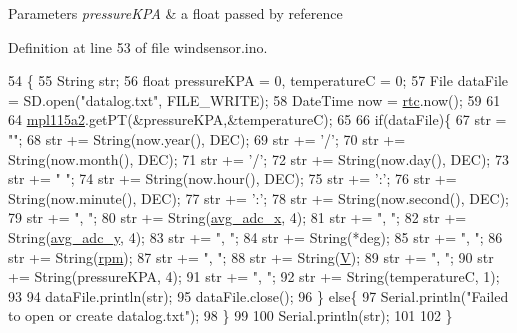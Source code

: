 \begin{DoxyParams}{Parameters}
{\em pressure\+K\+PA} & a float passed by reference\\
\hline
\end{DoxyParams}


Definition at line 53 of file windsensor.\+ino.


\begin{DoxyCode}
54 \{
55     String str;
56     \textcolor{keywordtype}{float} pressureKPA = 0, temperatureC = 0;
57     File dataFile = SD.open(\textcolor{stringliteral}{"datalog.txt"}, FILE\_WRITE);
58     DateTime now = \mbox{\hyperlink{windsensor_8ino_adab40bd3cc2c36728a2a34e813a75b88}{rtc}}.now();
59 
61 
64     \mbox{\hyperlink{windsensor_8ino_ad968397c6ea6b9db90c2cab353353f5a}{mpl115a2}}.getPT(&pressureKPA,&temperatureC);
65     
66     \textcolor{keywordflow}{if}(dataFile)\{
67         str = \textcolor{stringliteral}{""};
68         str += String(now.year(), DEC);
69         str += \textcolor{charliteral}{'/'};
70         str += String(now.month(), DEC);
71         str += \textcolor{charliteral}{'/'};
72         str += String(now.day(), DEC);
73         str += \textcolor{stringliteral}{" "};
74         str += String(now.hour(), DEC);
75         str += \textcolor{charliteral}{':'};
76         str += String(now.minute(), DEC);
77         str += \textcolor{charliteral}{':'};
78         str += String(now.second(), DEC);  
79         str += \textcolor{stringliteral}{", "};
80         str += String(\mbox{\hyperlink{windsensor_8ino_a4e68dc721cdeec90403f8d51073a0ff7}{avg\_adc\_x}}, 4);
81         str += \textcolor{stringliteral}{", "};
82         str += String(\mbox{\hyperlink{windsensor_8ino_a9721778a8fa458f3ae824eceb7d8f703}{avg\_adc\_y}}, 4);
83         str += \textcolor{stringliteral}{", "};
84         str += String(*deg);
85         str += \textcolor{stringliteral}{", "};
86         str += String(\mbox{\hyperlink{windsensor_8ino_a1571ae0d208fed39e6690affb377db08}{rpm}});
87         str += \textcolor{stringliteral}{", "};
88         str += String(\mbox{\hyperlink{windsensor_8ino_aa4fd0d57d98c7d4f1072f2edd19ab2ed}{V}});
89         str += \textcolor{stringliteral}{", "};
90         str += String(pressureKPA, 4);
91         str += \textcolor{stringliteral}{", "};
92         str += String(temperatureC, 1);
93 
94         dataFile.println(str);                                             
95         dataFile.close();
96     \} \textcolor{keywordflow}{else}\{
97         Serial.println(\textcolor{stringliteral}{"Failed to open or create datalog.txt"});       
98     \}
99 
100      Serial.println(str);
101 
102 \}
\end{DoxyCode}
\mbox{\label{windsensor_8ino_a0b33edabd7f1c4e4a0bf32c67269be2f}} 
